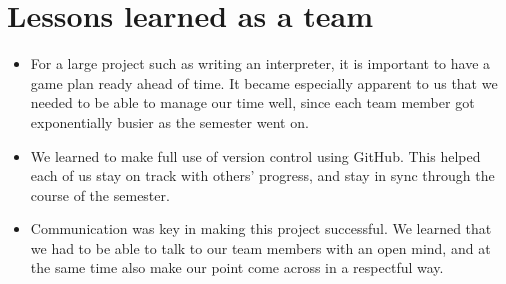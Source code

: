 
\section{Lessons learned as a team}
\begin{itemize}
\item For a large project such as writing an interpreter, it is important to have a game plan ready ahead of time. It became especially apparent to us that we needed to be able to manage our time well, since each team member got exponentially busier as the semester went on. 
\item We learned to make full use of version control using GitHub. This helped each of us stay on track with others' progress, and stay in sync through the course of the semester.
\item Communication was key in making this project successful. We learned that we had to be able to talk to our team members with an open mind, and at the same time also make our point come across in a respectful way.
\end{itemize}


